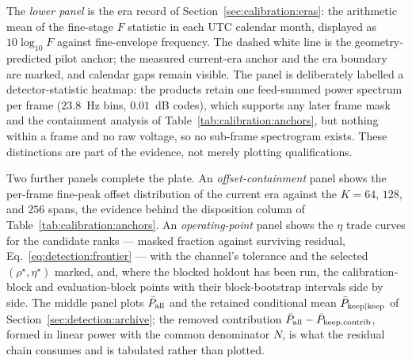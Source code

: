 The \emph{lower panel} is the era record of Section~\ref{sec:calibration:eras}:
the arithmetic mean of the fine-stage $F$ statistic in each UTC calendar
month, displayed as $10\log_{10}F$ against fine-envelope frequency.  The dashed
white line is the geometry-predicted pilot anchor; the measured current-era
anchor and the era boundary are marked, and calendar gaps remain visible.  The
panel is deliberately labelled a detector-statistic heatmap: the products
retain one feed-summed power spectrum per frame ($23.8$~Hz bins, $0.01$~dB
codes), which supports any later frame mask and the containment analysis of
Table~\ref{tab:calibration:anchors}, but nothing within a frame and no raw
voltage, so no sub-frame spectrogram exists.  These distinctions are part of
the evidence, not merely plotting qualifications.

Two further panels complete the plate.  An \emph{offset-containment} panel
shows the per-frame fine-peak offset distribution of the current era against
the $K = 64$, $128$, and $256$ spans, the evidence behind the disposition
column of Table~\ref{tab:calibration:anchors}.  An \emph{operating-point}
panel shows the $\eta$ trade curves for the candidate ranks --- masked
fraction against surviving residual, Eq.~\eqref{eq:detection:frontier} ---
with the channel's tolerance and the selected $(\rho^\star,\eta^\star)$
marked, and, where the blocked holdout has been run, the calibration-block and
evaluation-block points with their block-bootstrap intervals side by side.
The middle panel plots $\bar P_{\rm all}$ and the retained conditional mean
$\bar P_{\rm keep|keep}$ of Section~\ref{sec:detection:archive}; the removed
contribution $\bar P_{\rm all} - \bar P_{\rm keep,contrib}$, formed in linear
power with the common denominator $N$, is what the residual chain consumes and
is tabulated rather than plotted.



